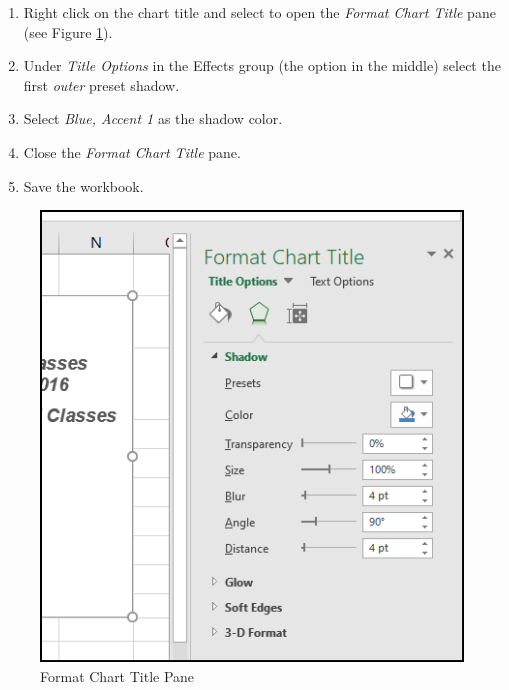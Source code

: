 \begin{enumbox}
\begin{enumerate}
		\item Right click on the chart title and select  to open the \textit{Format Chart Title} pane (see Figure \ref{04:fig33}).
		\item Under \textit{Title Options} in the Effects group (the option in the middle) select the first \textit{outer} preset shadow. 
		\item Select \textit{Blue, Accent 1} as the shadow color.
		\item Close the \textit{Format Chart Title} pane.
		\item Save the  workbook.
	\end{enumerate}
\end{enumbox}
	
\begin{figure}[H]
	\centering
	\includegraphics[width=\maxwidth{.75\linewidth}]{gfx/ch04_fig33}
	\caption{Format Chart Title Pane}
	\label{04:fig33}
\end{figure}

